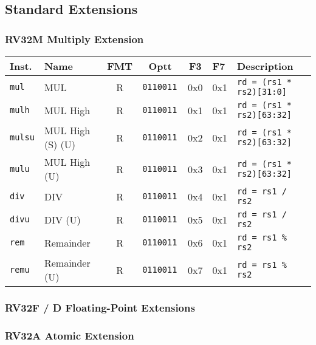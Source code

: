 \subsection*{Standard Extensions}

\subsubsection*{RV32M Multiply Extension}
\begin{tabular}
{l | l | c | c | c | l | l } \hline
Inst.       & Name              & FMT   & Optt         & F3  & F7  & Description                \\ \hline
\tt{mul}  & MUL               & R     & \tt{0110011} & 0x0 & 0x1 & \tt{rd = (rs1 * rs2)[31:0]}  \\
\tt{mulh} & MUL High          & R     & \tt{0110011} & 0x1 & 0x1 & \tt{rd = (rs1 * rs2)[63:32]} \\
\tt{mulsu}& MUL High (S) (U)  & R     & \tt{0110011} & 0x2 & 0x1 & \tt{rd = (rs1 * rs2)[63:32]} \\
\tt{mulu} & MUL High (U)      & R     & \tt{0110011} & 0x3 & 0x1 & \tt{rd = (rs1 * rs2)[63:32]} \\
\tt{div}  & DIV               & R     & \tt{0110011} & 0x4 & 0x1 & \tt{rd = rs1 / rs2}          \\
\tt{divu} & DIV (U)           & R     & \tt{0110011} & 0x5 & 0x1 & \tt{rd = rs1 / rs2}          \\
\tt{rem}  & Remainder         & R     & \tt{0110011} & 0x6 & 0x1 & \tt{rd = rs1 \% rs2}         \\
\tt{remu} & Remainder (U)     & R     & \tt{0110011} & 0x7 & 0x1 & \tt{rd = rs1 \% rs2}         \\
\hline
\end{tabular}

\subsubsection*{RV32F / D Floating-Point Extensions}

\subsubsection*{RV32A Atomic Extension}
